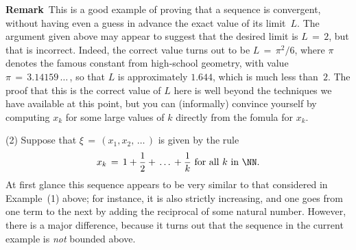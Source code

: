         {\bf Remark}\, This is a good example of proving that a sequence is convergent, without having even a guess in advance the exact value of its limit~$L$.
    The argument given above may appear to suggest that the desired limit is $L \,=\, 2$, but that is incorrect. Indeed, the correct value turns out to be $L \,=\, {\pi}^{2}/6$,
    where ${\pi}$ denotes the famous constant from high-school geometry, with value ${\pi} \,=\, 3.14159\,{\ldots}\,$, so that $L$ is approximately $1.644$, which is much less than~$2$.
    The proof that this is the correct value of $L$ here is well beyond the techniques we have available at this point,
    but you can (informally) convince yourself by computing $x_{k}$ for some large values of $k$ directly from the fomula for $x_{k}$.


\V

        (2) Suppose that ${\xi} \,=\, (x_{1},x_{2},\,{\ldots}\,)$ is given by the rule
        \begin{displaymath}
        x_{k} \,=\, 1 + \frac{1}{2} + \,{\ldots}\, + \frac{1}{k} \mbox{ for all $k$ in ${\NN}$}.
        \end{displaymath}
    At first glance this sequence appears to be very similar to that considered in Example~(1) above;
    for instance, it is also strictly increasing, and one goes from one term to the next by  adding the reciprocal of some natural number.
    However, there is a major difference, because it turns out that the sequence in the current example is {\em not} bounded above.

